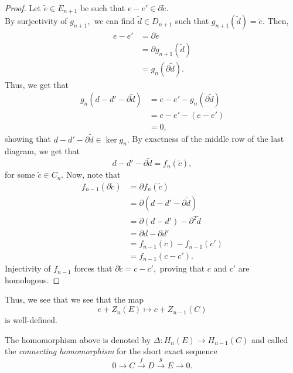 \documentclass[12pt]{article}
\begin{document}
\begin{proof} 
	Let $\tilde{e} \in E_{n+1}$ be such that $e - e' \in \partial \tilde{e}.$\\
	By surjectivity of $g_{n+1},$ we can find $\tilde{d} \in D_{n+1}$ such that $g_{n+1}(\tilde{d}) = \tilde{e}.$ Then,
	\begin{align*} 
		e - e' &= \partial\tilde{e}\\
		&= \partial g_{n+1}(\tilde{d})\\
		&= g_n(\partial \tilde{d}).
	\end{align*}
	Thus, we get that
	\begin{align*} 
		g_n(d - d' - \partial \tilde{d}) &= e - e' - g_n(\partial\tilde{d})\\
		&= e - e' - (e - e')\\
		&= 0,
	\end{align*}
	showing that $d - d' - \partial \tilde{d} \in \ker g_n.$ By exactness of the middle row of the last diagram, we get that
	\begin{equation*} 
		d - d' - \partial \tilde{d} = f_n(\tilde{c}),
	\end{equation*}
	for some $\tilde{c} \in C_n.$ Now, note that
	\begin{align*} 
		f_{n-1}(\partial\tilde{c}) &= \partial f_n(\tilde{c})\\
		&= \partial(d - d' - \partial \tilde{d})\\
		&= \partial(d - d') - \partial^2 \tilde{d}\\
		&= \partial d - \partial d'\\
		&= f_{n-1}(c) - f_{n-1}(c')\\
		&= f_{n-1}(c - c').
	\end{align*}
	Injectivity of $f_{n-1}$ forces that $\partial \tilde{c} = c - c',$ proving that $c$ and $c'$ are homologous.
\end{proof}

Thus, we see that we see that the map
\begin{equation*} 
	e + Z_n(E) \mapsto c + Z_{n-1}(C)
\end{equation*}
is well-defined. 

\begin{defn}
	The homomorphism above is denoted by $\Delta:H_n(E) \to H_{n-1}(C)$ and called the \emph{connecting homomorphism} for the short exact sequence
	\begin{equation*} 
		0 \overset{}{\longrightarrow} C \overset{f}{\longrightarrow} D \overset{g}{\longrightarrow} E \overset{}{\longrightarrow} 0.
	\end{equation*}
\end{defn}
\end{document}
